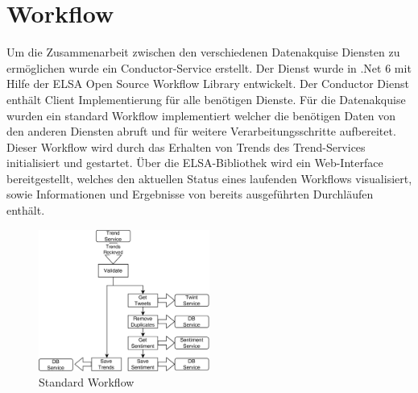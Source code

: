 \documentclass[conference]{IEEEtran}
\begin{document}
\section{Workflow}
Um die Zusammenarbeit zwischen den verschiedenen Datenakquise Diensten zu ermöglichen wurde ein Conductor-Service erstellt.
Der Dienst wurde in .Net 6 mit Hilfe der ELSA \cite{elsa} Open Source Workflow Library entwickelt.
Der Conductor Dienst enthält Client Implementierung für alle benötigen Dienste.
Für die Datenakquise wurden ein standard Workflow implementiert welcher die benötigen Daten von den anderen Diensten abruft und für weitere Verarbeitungsschritte aufbereitet.
Dieser Workflow wird durch das Erhalten von Trends des Trend-Services initialisiert und gestartet.
Über die ELSA-Bibliothek wird ein Web-Interface bereitgestellt, welches den aktuellen Status eines laufenden Workflows visualisiert, sowie Informationen und Ergebnisse von bereits ausgeführten Durchläufen enthält.

\begin{figure}[h]
    \includegraphics[width=0.5\textwidth]{Workflow.png}
    \caption{Standard Workflow}
\end{figure}
\end{document}
